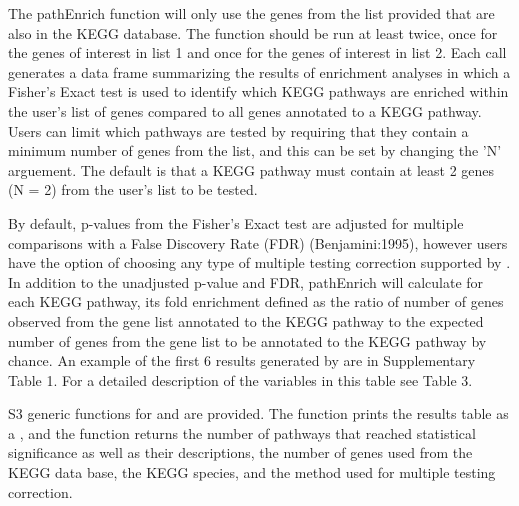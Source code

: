 \documentclass[article]{jss}\usepackage[]{graphicx}\usepackage[]{color}
\begin{document}
The pathEnrich function will only use the genes from the list provided that are
also in the KEGG database. The  function should be run at least
twice, once for the genes of interest in list 1 and once for the genes of
interest in list 2. Each  call generates a data frame
summarizing the results of enrichment analyses in which a Fisher’s Exact test is
used to identify which KEGG pathways are enriched within the user’s list of
genes compared to all genes annotated to a KEGG pathway. Users can limit which
pathways are tested by requiring that they contain a minimum number of genes
from the list, and this can be set by changing the 'N' arguement. The default is
that a KEGG pathway must contain at least 2 genes (N = 2) from the user’s list
to be tested.



By default, p-values from the Fisher’s Exact test are adjusted for multiple
comparisons with a False Discovery Rate (FDR) (Benjamini:1995), however users
have the option of choosing any type of multiple testing correction supported
by . In addition to the unadjusted p-value and FDR, pathEnrich
will calculate for each KEGG pathway, its fold enrichment defined as the ratio
of number of genes observed from the gene list annotated to the KEGG pathway to
the expected number of genes from the gene list to be annotated to the KEGG
pathway by chance. An example of the first 6 results generated by 
are in Supplementary Table 1. For a detailed description of the variables in this table see Table 3.




S3 generic functions for  and  are provided.
The  function prints the results table as a , and the
 function returns the number of pathways that reached statistical
significance as well as their descriptions, the number of genes used from the
KEGG data base, the KEGG species, and the method used for multiple testing
correction.
\end{document}
